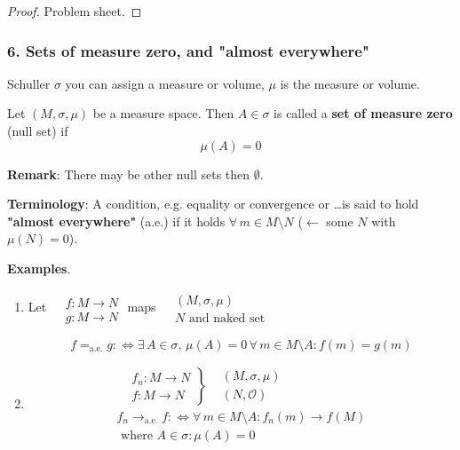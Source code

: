 \begin{proof}
	Problem sheet.
\end{proof}

\subsubsection{6. Sets of measure zero, and "almost everywhere"}

Schuller $\sigma$ you can assign a measure or volume, $\mu$ is the measure or volume.

\begin{definition}
	Let $(M, \sigma, \mu)$ be a measure space. Then
	$A\in \sigma$ is called a \textbf{set of measure zero} (null set) if
	\[
	\mu(A) = 0
	\]
\end{definition}

\textbf{Remark}: There may be other null sets then $\emptyset$.

\textbf{Terminology}: A condition, e.g. equality or convergence or \dots is said to hold \textbf{"almost everywhere"} (a.e.) if it holds $\forall \, m \in M \setminus N$ ($\leftarrow$ some $N$ with $\mu(N) = 0$).

\textbf{Examples}. 
\begin{enumerate}
	\item[(a)]
Let $\begin{aligned} & \quad \\
	& f: M \to N \\
	& g: M \to N \end{aligned}$ maps $\begin{aligned} & (M, \sigma, \mu) \\
	& N \text{ and naked set } \end{aligned}$
\begin{definition}
	\[
	f =_{\text{a.e.}} g : \Longleftrightarrow \exists \, A \in \sigma, \, \mu(A) = 0 \, \forall \, m \in M \setminus A : f(m) = g(m) 
	\]
\end{definition}
\item[(b)] 
\[
\begin{gathered}
	\left. \begin{aligned} & f_n: M \to N \\
		& f: M \to N \end{aligned}
\right\}  \begin{aligned} & (M, \sigma, \mu) \\ & (N, \mathcal{O}) \end{aligned} \\
f_n \to_{\text{a.e.} } f : \Longleftrightarrow \forall \, m \in M \setminus A: f_n(m) \to f(M) \\
\text{ where } A \in \sigma : \mu(A) = 0
\end{gathered}
\]
\end{enumerate}

